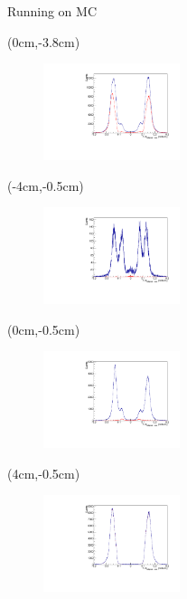 \documentclass[10pt]{beamer}
\begin{document}
{\begin{frame}{Running on MC}
	\begin{textblock*}{\textwidth}(0cm,-3.8cm)
		\begin{figure}
			\includegraphics[width=4cm]{Plots/isSignalDeltaPhi}
		
		\end{figure}
	\end{textblock*}

\begin{textblock*}{\textwidth}(-4cm,-0.5cm)
	\begin{figure}
		\includegraphics[width=4cm]{Plots/MCgg}
	\end{figure}
	
\end{textblock*}


\begin{textblock*}{\textwidth}(0cm,-0.5cm)
	\begin{figure}
		\includegraphics[width=4cm]{Plots/MCeg}
	\end{figure}
	
	\end{textblock*}	

\begin{textblock*}{\textwidth}(4cm,-0.5cm)
	\begin{figure}
		\includegraphics[width=4cm]{Plots/MCee}
	\end{figure}
	

\end{textblock*}
\end{frame}}
\end{document}
